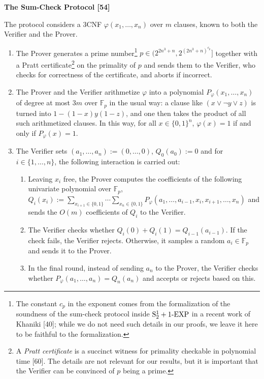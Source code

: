 \documentclass[11pt]{article}
\newcommand{\Stwo}{\mathrm{S}^{1}_{2}}
\newcommand{\oneEXP}{\textnormal{1-EXP}}
\newcommand{\Fp}{\mathbb{F}_{p}}
\begin{document}
\medskip\noindent\textbf{The Sum-Check Protocol [54]}

The protocol considers a 3CNF $\varphi(x_{1},\dots,x_{n})$ over $m$ clauses, known to both the
Verifier and the Prover.
\begin{enumerate}
\item The Prover generates a prime number\footnote{The constant $c_{p}$ in the exponent comes
from the formalization of the soundness of the sum-check protocol inside $\Stwo+\oneEXP$ in a
recent work of Khaniki [40]; while we do not need such details in our proofs, we leave it here
to be faithful to the formalization.}
$p \in (2^{2n^{3}+n}, 2^{(2n^{3}+n)^{c_{p}}}]$ together with a Pratt certificate\footnote{A
\emph{Pratt certificate} is a succinct witness for primality checkable in polynomial time [60].
The details are not relevant for our results, but it is important that the Verifier can be
convinced of $p$ being a prime.} on the primality of $p$ and sends them to the Verifier, who
checks for correctness of the certificate, and aborts if incorrect.
\item The Prover and the Verifier arithmetize $\varphi$ into a polynomial
$P_{\varphi}(x_{1},\dots,x_{n})$ of degree at most $3m$ over $\Fp$ in the usual way: a clause
like $(x \vee \neg y \vee z)$ is turned into $1-(1-x)y(1-z)$, and one then takes the product of
all such arithmetized clauses. In this way, for all $x \in \{0,1\}^{n}$,
$\varphi(x) = 1$ if and only if $P_{\varphi}(x) = 1$.
\item The Verifier sets $(a_{1},\dots,a_{n}) := (0,\dots,0)$, $Q_{0}(a_{0}) := 0$ and for
$i \in \{1,\dots,n\}$, the following interaction is carried out:
  \begin{enumerate}
  \item[a.] Leaving $x_{i}$ free, the Prover computes the coefficients of the following
    univariate polynomial over $\Fp$,
    $Q_{i}(x_{i}) := \sum_{x_{i+1}\in\{0,1\}} \cdots \sum_{x_{n}\in\{0,1\}}
     P_{\varphi}(a_{1},\dots,a_{i-1},x_{i},x_{i+1},\dots,x_{n})$
    and sends the $O(m)$ coefficients of $Q_{i}$ to the Verifier.
  \item[b.] The Verifier checks whether $Q_{i}(0)+Q_{i}(1) = Q_{i-1}(a_{i-1})$. If the check
    fails, the Verifier rejects. Otherwise, it samples a random $a_{i} \in \Fp$ and sends it to
    the Prover.
  \item[c.] In the final round, instead of sending $a_{n}$ to the Prover, the Verifier checks
    whether $P_{\varphi}(a_{1},\dots,a_{n}) = Q_{n}(a_{n})$ and accepts or rejects based on this.
  \end{enumerate}
\end{enumerate}
\end{document}
